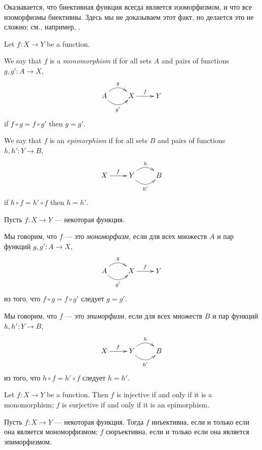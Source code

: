 \documentclass[../main/CT4S-EN-RU]{subfiles}
\begin{document}
\begin{remarkRUS}
Оказывается, что биективная функция всегда является изоморфизмом, и что все изоморфизмы биективны. Здесь мы не доказываем этот факт, но делается это не сложно; см., например, \cite[Theorem 5.4]{Big}.
\end{remarkRUS}

\begin{definitionENG}\label{def:mono, epi in set}
Let $f\colon X{→} Y$ be a function. 

We say that $f$ is a {\em monomorphism} if for all sets $A$ and pairs of functions $g,g'\colon A{→} X,$
$$
\xymatrix{A\ar@/^1pc/[r]^g\ar@/_1pc/[r]_{g'}&X\ar[r]^f&Y}
$$
if $f\circ g=f\circ g'$ then $g=g'.$

We say that $f$ is an {\em epimorphism} if for all sets $B$ and pairs of functions $h,h'\colon Y{→} B,$ 
$$
\xymatrix{X\ar[r]^f&Y\ar@/^1pc/[r]^h\ar@/_1pc/[r]_{h'}&B}
$$
if $h\circ f=h'\circ f$ then $h=h'.$
\end{definitionENG}

\begin{definitionRUS}\label{def:mono, epi in set}
Пусть $f\colon X{→} Y$ — некоторая функция. 

Мы говорим, что $f$ — это {\em мономорфизм}, если для всех множеств $A$ и пар функций $g,g'\colon A{→} X,$
$$
\xymatrix{A\ar@/^1pc/[r]^g\ar@/_1pc/[r]_{g'}&X\ar[r]^f&Y}
$$
из того, что $f\circ g=f\circ g'$ следует $g=g'.$

Мы говорим, что $f$ — это {\em эпиморфизм}, если для всех множеств $B$ и пар функций $h,h'\colon Y{→} B,$ 
$$
\xymatrix{X\ar[r]^f&Y\ar@/^1pc/[r]^h\ar@/_1pc/[r]_{h'}&B}
$$
из того, что $h\circ f=h'\circ f$ следует $h=h'.$
\end{definitionRUS}

\begin{propositionENG}\label{prop:inj and surj}
Let $f\colon X{→} Y$ be a function. Then $f$ is injective if and only if it is a monomorphism; $f$ is surjective if and only if it is an epimorphism.
\end{propositionENG}

\begin{propositionRUS}\label{prop:inj and surj}
Пусть $f\colon X{→} Y$ — некоторая функция. Тогда $f$ инъективна, если и только если она является мономорфизмом; $f$ сюръективна, если и только если она является эпиморфизмом.
\end{propositionRUS}
\end{document}
